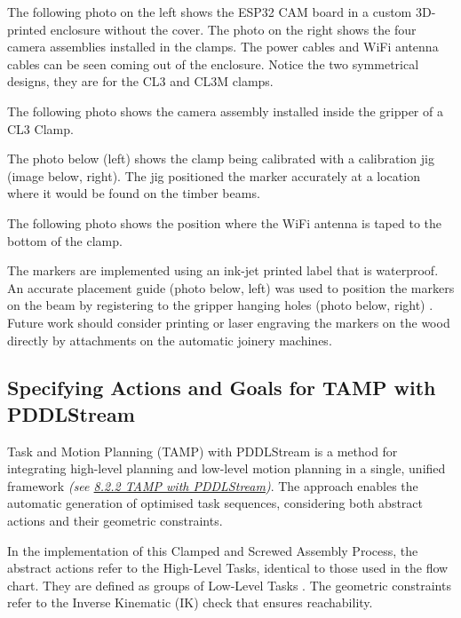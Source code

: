 


The following photo on the left shows the ESP32 CAM board in a custom 3D-printed enclosure without the cover. The photo on the right shows the four camera assemblies installed in the clamps. The power cables and WiFi antenna cables can be seen coming out of the enclosure. Notice the two symmetrical designs, they are for the CL3 and CL3M clamps.




The following photo shows the camera assembly installed inside the gripper of a CL3 Clamp. 




The photo below (left) shows the clamp being calibrated with a calibration jig (image below, right). The jig positioned the marker accurately at a location where it would be found on the timber beams.




The following photo shows the position where the WiFi antenna is taped to the bottom of the clamp.




The markers are implemented using an ink-jet printed label that is waterproof. An accurate placement guide (photo below, left) was used to position the markers on the beam by registering to the gripper hanging holes (photo below, right) . Future work should consider printing or laser engraving the markers on the wood directly by attachments on the automatic joinery machines.




\subsection{Specifying Actions and Goals for TAMP with PDDLStream}
\label{subsection:exploration-5-specifying-actions-and-goals-for-tamp-with-pddlstream}

Task and Motion Planning (TAMP) with PDDLStream is a method for integrating high-level planning and low-level motion planning in a single, unified framework \textit{(see \ul{8.2.2 TAMP with PDDLStream})}. The approach enables the automatic generation of optimised task sequences, considering both abstract actions and their geometric constraints. 

In the implementation of this Clamped and Screwed Assembly Process, the abstract actions refer to the High-Level Tasks, identical to those used in the flow chart. They are defined as groups of Low-Level Tasks . The geometric constraints refer to the Inverse Kinematic (IK) check that ensures reachability. 


